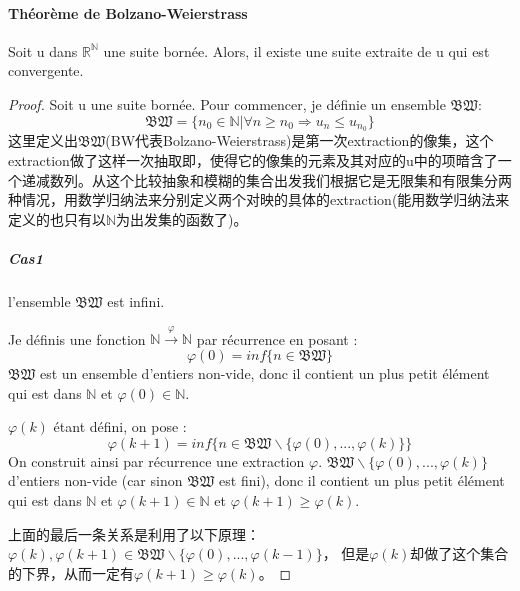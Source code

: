 \documentclass[12pt]{book}
\theoremstyle{definition}\newtheorem{dfn}{Définition}[chapter]
\theoremstyle{plain}\newtheorem{thm}{Théorème}[chapter]
\theoremstyle{plain}\newtheorem{prp}{Proposition}[chapter]
\theoremstyle{plain}\newtheorem{lem}{\bf Lemme}[chapter]
\theoremstyle{plain}\newtheorem{axm}{\bf Axiome}[chapter]
\theoremstyle{plain}\newtheorem{lmm}{\bf Lemme}[chapter]
\theoremstyle{plain}\newtheorem{cor}{\bf Corollaire}[chapter]
\theoremstyle{remark}\newtheorem{rem}{Remarque}[chapter]
\begin{document}
\paragraph{Théorème de Bolzano-Weierstrass}
Soit u dans $\mathbb{R}^\mathbb{N}$ une suite bornée. Alors, il existe une suite extraite de u qui est convergente.
\begin{proof}
Soit u une suite bornée. Pour commencer, je définie un ensemble $\mathfrak{BW}$:
\begin{equation*}
\mathfrak{BW} = \{n_0 \in \mathbb{N}|\forall n \ge n_0 \Longrightarrow u_{n} \leqslant u_{n_0} \}
\end{equation*}
这里定义出$\mathfrak{BW}$(BW代表Bolzano-Weierstrass)是第一次extraction的像集，这个extraction做了这样一次抽取即，使得它的像集的元素及其对应的u中的项暗含了一个递减数列。从这个比较抽象和模糊的集合出发我们根据它是无限集和有限集分两种情况，用数学归纳法来分别定义两个对映的具体的extraction(能用数学归纳法来定义的也只有以$\mathbb{N}$为出发集的函数了)。
\subparagraph{Cas1}
l’ensemble $\mathfrak{BW}$ est infini.

Je définis une fonction $\mathbb{N}\xrightarrow{\varphi} \mathbb{N}$ par récurrence en posant :
\begin{equation*}
\varphi(0)=inf\{n \in \mathfrak{BW}\}
\end{equation*}
$\mathfrak{BW}$ est un ensemble d’entiers non-vide, donc il contient un plus petit élément qui est dans $\mathbb{N}$ et
$\varphi(0) \in \mathbb{N}$.


$\varphi(k)$ étant défini, on pose :
\begin{equation*}
\varphi(k+1)=inf\{n \in \mathfrak{BW}\backslash \{\varphi(0),...,\varphi(k)\}\}
\end{equation*}
On construit ainsi par récurrence une extraction $\varphi$.
 $\mathfrak{BW}\backslash \{\varphi(0),...,\varphi(k)\}$ d’entiers non-vide (car sinon $\mathfrak{BW}$ est fini), donc il contient un plus petit élément qui est dans $\mathbb{N}$ et $\varphi(k+1) \in \mathbb{N}$ et $\varphi(k+1) \ge \varphi(k)$.

 上面的最后一条关系是利用了以下原理：$\varphi(k) , \varphi(k+1) \in \mathfrak{BW}\backslash \{\varphi(0),...,\varphi(k-1)\}$，
 但是$\varphi(k)$却做了这个集合的下界，从而一定有$\varphi(k+1) \ge \varphi(k)$。


\end{proof}
\end{document}
